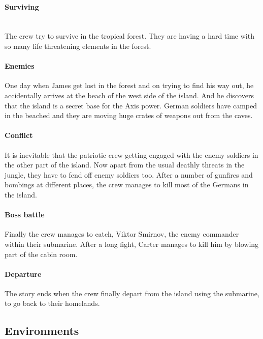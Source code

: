         \paragraph{Surviving}\mbox{}\\
            The crew try to survive in the tropical forest. They are having a hard
            time with so many life threatening elements in the forest. 
        \paragraph{Enemies}
            One day when James get lost in the forest and on trying to find his way
            out, he accidentally arrives at the beach of the west side of the island. 
            And he discovers that the island is a secret base for the Axis power.
            German soldiers have camped in the beached and they are moving huge crates 
            of weapons out from the caves.
        \paragraph{Conflict}
            It is inevitable that the patriotic crew getting engaged with the enemy
            soldiers in the other part of the island. Now apart from the usual deathly
            threats in the jungle, they have to fend off enemy soldiers too. 
            After a number of gunfires and bombings at different places, the crew 
            manages to kill most of the Germans in the island. 
        \paragraph{Boss battle}
            Finally the crew manages to catch, Viktor Smirnov, the enemy commander 
            within their submarine. After a long fight, Carter manages to kill him 
            by blowing part of the cabin room. 
        \paragraph{Departure}
            The story ends when the crew finally depart from the island using the
            submarine, to go back to their homelands. 
    \subsection{Environments}
